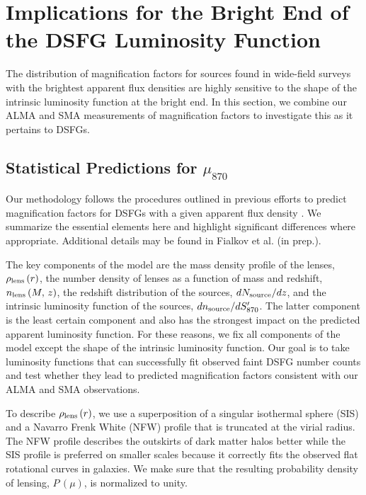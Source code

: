 \documentclass[iop]{emulateapj}
\begin{document}
\section{Implications for the Bright End of the DSFG Luminosity
Function}\label{sec:discuss}

The distribution of magnification factors for sources found in wide-field
surveys with the brightest apparent flux densities are highly sensitive to the
shape of the intrinsic luminosity function at the bright end.  In this section,
we combine our ALMA and SMA measurements of magnification factors to investigate
this as it pertains to DSFGs.

\subsection{Statistical Predictions for $\mu_{870}$}\label{sec:statpredict}

Our methodology follows the procedures outlined in previous efforts to predict
magnification factors for DSFGs with a given apparent flux density
\citep[chiefly,][]{Lima:2010fk, Wardlow:2013lr}.  We summarize the essential
elements here and highlight significant differences where appropriate.
Additional details may be found in Fialkov et al. (in prep.).  

The key components of the model are the mass density profile of the lenses,
$\rho_{\rm lens}\,(r)$, the number density of lenses as a function of mass and
redshift, $n_{\rm lens}\,(M, \, z)$, the redshift distribution of the sources,
$dN_{\rm source}/dz$, and the intrinsic luminosity function of the sources,
$dn_{\rm source}/dS_{870}^\prime$.  The latter component is the least certain
component and also has the strongest impact on the predicted apparent
luminosity function.  For these reasons, we fix all components of the model
except the shape of the intrinsic luminosity function.  Our goal is to take
luminosity functions that can successfully fit observed faint DSFG number
counts \citep{Karim:2013lr} and test whether they lead to predicted
magnification factors consistent with our ALMA and SMA observations.

To describe $\rho_{\rm lens}\,(r)$, we use a superposition of a singular
isothermal sphere (SIS) and a Navarro Frenk White (NFW) profile
\citep{Navarro:1997ys} that is truncated at the virial radius.  The NFW profile
describes the outskirts of dark matter halos better while the SIS profile is
preferred on smaller scales because it correctly fits the observed flat
rotational curves in galaxies.  We make sure that the resulting probability
density of lensing, $P\,(\mu)$, is normalized to unity. 
\end{document}
